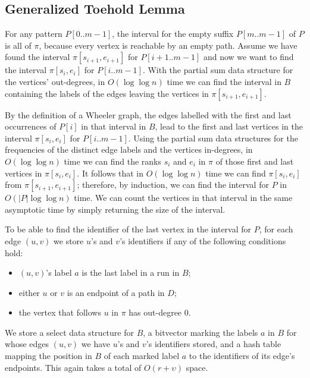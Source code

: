 \subsection{Generalized Toehold Lemma}
\label{subsec:toehold}

For any pattern $P [0..m - 1]$, the interval for the empty suffix $P [m..m - 1]$ of $P$ is all of $\pi$, because every vertex is reachable by an empty path.  Assume we have found the interval $\pi [s_{i + 1}, e_{i + 1}]$ for $P [i + 1..m - 1]$ and now we want to find the interval $\pi [s_i, e_i]$ for $P [i..m - 1]$.  With the partial sum data structure for the vertices' out-degrees, in $O (\log \log n)$ time we can find the interval in $B$ containing the labels of the edges leaving the vertices in $\pi [s_{i + 1}, e_{i + 1}]$.

By the definition of a Wheeler graph, the edges labelled with the first and last occurrences of $P [i]$ in that interval in $B$, lead to the first and last vertices in the interval $\pi [s_i, e_i]$ for $P [i..m - 1]$.  Using the partial sum data structures for the frequencies of the distinct edge labels and the vertices in-degrees, in $O (\log \log n)$ time we can find the ranks $s_i$ and $e_i$ in $\pi$ of those first and last vertices in $\pi [s_i, e_i]$.  It follows that in $O (\log \log n)$ time we can find $\pi [s_i, e_i]$ from $\pi [s_{i + 1}, e_{i + 1}]$; therefore, by induction, we can find the interval for $P$ in $O (|P| \log \log n)$ time.  We can count the vertices in that interval in the same asymptotic time by simply returning the size of the interval.

To be able to find the identifier of the last vertex in the interval for $P$, for each edge $(u, v)$ we store $u$'s and $v$'s identifiers if any of the following conditions hold:
\begin{itemize}
\item $(u, v)$'s label $a$ is the last label in a run in $B$;
\item either $u$ or $v$ is an endpoint of a path in $D$;
\item the vertex that follows $u$ in $\pi$ has out-degree 0.
\end{itemize}
We store a select data structure for $B$, a bitvector marking the labels $a$ in $B$ for whose edges $(u, v)$ we have $u$'s and $v$'s identifiers stored, and a hash table mapping the position in $B$ of each marked label $a$ to the identifiers of its edge's endpoints.  This again takes a total of $O (r + \upsilon)$ space.

